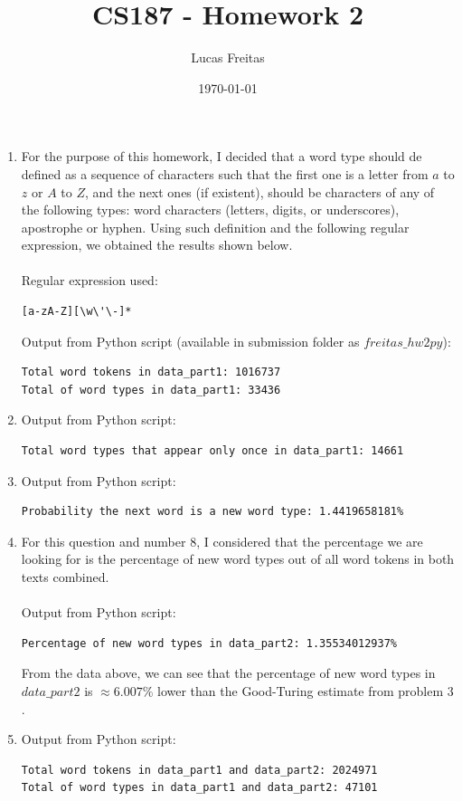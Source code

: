 \documentclass[11pt]{article}
\title{CS187 - Homework 2}
\author{Lucas Freitas}
\date{\today}
\begin{document}
\maketitle
\begin {enumerate}

\item
For the purpose of this homework, I decided that a word type should de defined as a sequence of characters such that the first one is a letter from $a$ to $z$ or $A$ to $Z$, and the next ones (if existent), should be characters of any of the following types: word characters (letters, digits, or underscores), apostrophe or hyphen. Using such definition and the following regular expression, we obtained the results shown below.
\\
\\
Regular expression used:
\begin{verbatim}
[a-zA-Z][\w\'\-]*
\end{verbatim}
Output from Python script (available in submission folder as $freitas\_hw2py$):
\begin{verbatim}
Total word tokens in data_part1: 1016737
Total of word types in data_part1: 33436
\end{verbatim}

\item
Output from Python script:
\begin{verbatim}
Total word types that appear only once in data_part1: 14661
\end{verbatim}

\item
Output from Python script:
\begin{verbatim}
Probability the next word is a new word type: 1.4419658181%
\end{verbatim}

\item
For this question and number $8$, I considered that the percentage we are looking for is the percentage of new word types out of all word tokens in both texts combined.
\\
\\
Output from Python script:
\begin{verbatim}
Percentage of new word types in data_part2: 1.35534012937%
\end{verbatim}
From the data above, we can see that the percentage of new word types in $data\_part2$ is $\approx6.007\%$ lower than the Good-Turing estimate from problem $3$.
\item
Output from Python script:
\begin{verbatim}
Total word tokens in data_part1 and data_part2: 2024971
Total of word types in data_part1 and data_part2: 47101
\end{verbatim}


\end{enumerate}
\end{document}
